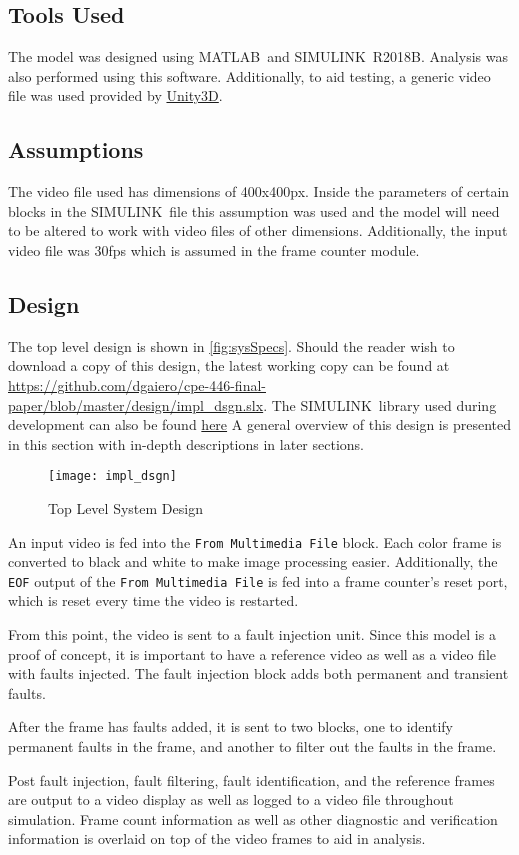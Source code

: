 \subsection{Tools Used}
The model was designed using MATLAB\textregisteredmark\ and SIMULINK\textregisteredmark\ R2018B. Analysis was also performed using this software. Additionally, to aid testing, a generic video file was used provided by \hyperlink{https://blogs.unity3d.com/2016/11/28/free-vfx-image-sequences-flipbooks/}{Unity3D}.
\subsection{Assumptions}
The video file used has dimensions of 400x400px. Inside the parameters of certain blocks in the SIMULINK\textregisteredmark\ file this assumption was used and the model will need to be altered to work with video files of other dimensions. Additionally, the input video file was 30fps which is assumed in the frame counter module.
\subsection{Design}
The top level design is shown in \autoref{fig:sysSpecs}. Should the reader wish to download a copy of this design, the latest working copy can be found at \hyperlink{https://github.com/dgaiero/cpe-446-final-paper/blob/master/design/impl_dsgn.slx}{https://github.com/dgaiero/cpe-446-final-paper/blob/master/design/impl\_dsgn.slx}. The SIMULINK\textregisteredmark\ library used during development can also be found \hyperlink{https://github.com/dgaiero/cpe-446-final-paper/blob/master/design/library.slx}{here} A general overview of this design is presented in this section with in-depth descriptions in later sections.
\begin{figure}[H]
    \texttt{[image: impl\_dsgn]}
    \caption{Top Level System Design}
    \label{fig:sysSpecs}
\end{figure}
\medskip
\par An input video is fed into the \verb!From Multimedia File! block. Each color frame is converted to black and white to make image processing easier. Additionally, the \verb!EOF! output of the \verb!From Multimedia File! is fed into a frame counter's reset port, which is reset every time the video is restarted.
\par From this point, the video is sent to a fault injection unit. Since this model is a proof of concept, it is important to have a reference video as well as a video file with faults injected. The fault injection block adds both permanent and transient faults.
\par After the frame has faults added, it is sent to two blocks, one to identify permanent faults in the frame, and another to filter out the faults in the frame.
\par Post fault injection, fault filtering, fault identification, and the reference frames are output to a video display as well as logged to a video file throughout simulation. Frame count information as well as other diagnostic and verification information is overlaid on top of the video frames to aid in analysis.
